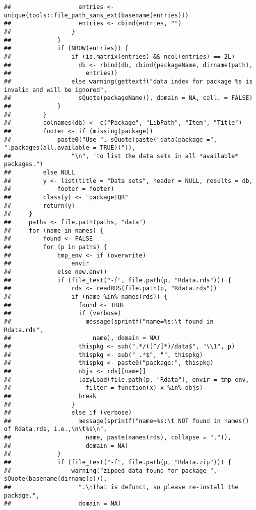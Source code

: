 \documentclass[
]{book}
\begin{document}
\begin{verbatim}
##                   entries <- unique(tools::file_path_sans_ext(basename(entries)))
##                   entries <- cbind(entries, "")
##                 }
##             }
##             if (NROW(entries)) {
##                 if (is.matrix(entries) && ncol(entries) == 2L) 
##                   db <- rbind(db, cbind(packageName, dirname(path), 
##                     entries))
##                 else warning(gettextf("data index for package %s is invalid and will be ignored", 
##                   sQuote(packageName)), domain = NA, call. = FALSE)
##             }
##         }
##         colnames(db) <- c("Package", "LibPath", "Item", "Title")
##         footer <- if (missing(package)) 
##             paste0("Use ", sQuote(paste("data(package =", ".packages(all.available = TRUE))")), 
##                 "\n", "to list the data sets in all *available* packages.")
##         else NULL
##         y <- list(title = "Data sets", header = NULL, results = db, 
##             footer = footer)
##         class(y) <- "packageIQR"
##         return(y)
##     }
##     paths <- file.path(paths, "data")
##     for (name in names) {
##         found <- FALSE
##         for (p in paths) {
##             tmp_env <- if (overwrite) 
##                 envir
##             else new.env()
##             if (file_test("-f", file.path(p, "Rdata.rds"))) {
##                 rds <- readRDS(file.path(p, "Rdata.rds"))
##                 if (name %in% names(rds)) {
##                   found <- TRUE
##                   if (verbose) 
##                     message(sprintf("name=%s:\t found in Rdata.rds", 
##                       name), domain = NA)
##                   thispkg <- sub(".*/([^/]*)/data$", "\\1", p)
##                   thispkg <- sub("_.*$", "", thispkg)
##                   thispkg <- paste0("package:", thispkg)
##                   objs <- rds[[name]]
##                   lazyLoad(file.path(p, "Rdata"), envir = tmp_env, 
##                     filter = function(x) x %in% objs)
##                   break
##                 }
##                 else if (verbose) 
##                   message(sprintf("name=%s:\t NOT found in names() of Rdata.rds, i.e.,\n\t%s\n", 
##                     name, paste(names(rds), collapse = ",")), 
##                     domain = NA)
##             }
##             if (file_test("-f", file.path(p, "Rdata.zip"))) {
##                 warning("zipped data found for package ", sQuote(basename(dirname(p))), 
##                   ".\nThat is defunct, so please re-install the package.", 
##                   domain = NA)

\end{verbatim}
\end{document}
